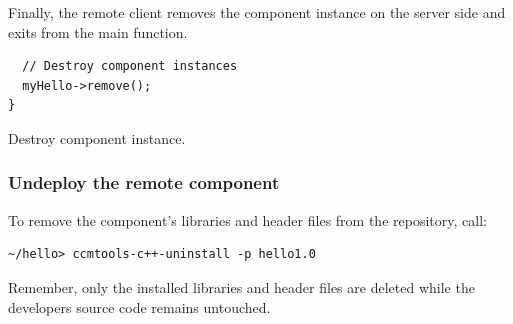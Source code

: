 \noindent
Finally, the remote client removes the component instance on the server side
and exits from the main function.

\begin{Example}
\begin{minifbox}
\begin{small}
\begin{verbatim}
  // Destroy component instances
  myHello->remove();
}
\end{verbatim}
\end{small}
\end{minifbox}
\caption{Destroy component instance.}
\label{DestroyComponent}
\end{Example}



\subsubsection{Undeploy the remote component}

To remove the component's libraries and header files from the repository, 
call:
\begin{verbatim}
~/hello> ccmtools-c++-uninstall -p hello1.0
\end{verbatim}
Remember, only the installed libraries and header files are deleted while
the developers source code remains untouched.


